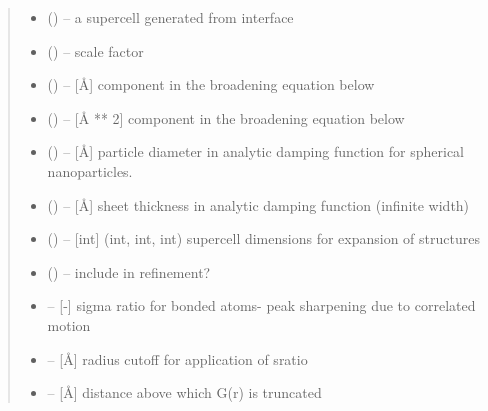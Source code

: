 \documentclass[letterpaper,10pt,english]{sphinxmanual}
\begin{document}
\begin{fulllineitems}
\begin{fulllineitems}
\begin{quote}
\begin{description}
\begin{itemize}
\item {} 
 () -- a supercell generated from interface

\item {} 
 () -- scale factor

\item {} 
 () -- {[}Å{]} component in the broadening equation below

\item {} 
 () -- {[}Å ** 2{]} component in the broadening equation below

\item {} 
 () -- {[}Å{]} particle diameter in analytic damping function for spherical nanoparticles.

\item {} 
 () -- {[}Å{]} sheet thickness in analytic damping function (infinite width)

\item {} 
 (\sphinxstyleliteralemphasis{, }) -- {[}int{]} (int, int, int) supercell dimensions for expansion of structures

\item {} 
 () -- include in refinement?

\item {} 
 -- {[}-{]} sigma ratio for bonded atoms- peak sharpening due to correlated motion

\item {} 
 -- {[}Å{]} radius cutoff for application of sratio

\item {} 
 -- {[}Å{]} distance above which G(r) is truncated

\end{itemize}

\end{description}\end{quote}


\end{fulllineitems}
\end{fulllineitems}
\end{document}
